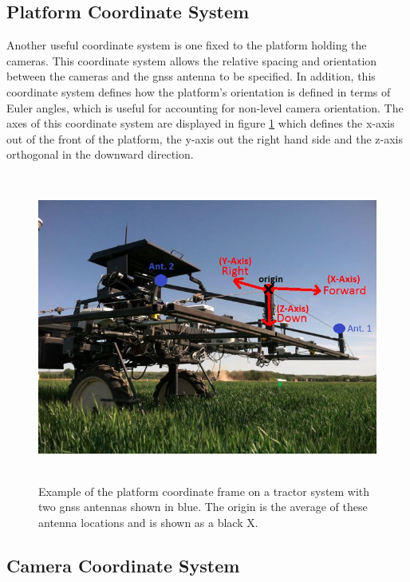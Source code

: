 \subsection{Platform Coordinate System}
\label{platform_coordinate_system}

Another useful coordinate system is one fixed to the platform holding the cameras.  This coordinate system allows the relative spacing and orientation between the cameras and the \ac{gnss} antenna to be specified.  In addition, this coordinate system defines how the platform's orientation is defined in terms of Euler angles, which is useful for accounting for non-level camera orientation.  The axes of this coordinate system are displayed in figure \ref{platform_frame} which defines the x-axis out of the front of the platform, the y-axis out the right hand side and the z-axis orthogonal in the downward direction.  

\begin{figure}
	\centering
    \includegraphics[height=4in]{figures/platform_frame_2_gps.jpg}
    \caption[Platform coordinate frame]{Example of the platform coordinate frame on a tractor system with two \ac{gnss} antennas shown in blue. The origin is the average of these antenna locations and is shown as a black X.}
    \label{platform_frame}
\end{figure}

\subsection{Camera Coordinate System}

